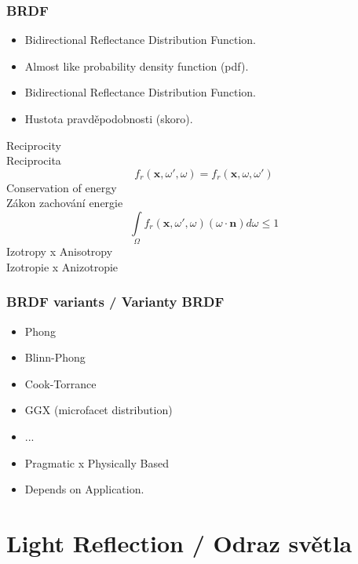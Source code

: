 \begin{frame}\frametitle{BRDF}
  \scriptsize
  \begin{itemize}
      \item Bidirectional Reflectance Distribution Function.
      \item Almost like probability density function (pdf).
  \end{itemize}
  \begin{itemize}
      \item Bidirectional Reflectance Distribution Function.
      \item Hustota pravděpodobnosti (skoro).
  \end{itemize}
  \pause\vfill
  Reciprocity\\
  Reciprocita
  \begin{equation*}
      f_r(\mathbf x, \omega', \omega) = f_r(\mathbf x, \omega, \omega')
  \end{equation*}
  Conservation of energy\\
  Zákon zachování energie
  \begin{equation*}
      \int\limits_\Omega f_r(\mathbf x, \omega', \omega) (\omega \cdot \mathbf n) d\omega \le 1
  \end{equation*}
  Izotropy x Anisotropy\\
  Izotropie x Anizotropie
\end{frame}

\begin{frame}\frametitle{BRDF variants / Varianty BRDF}
  \begin{itemize}
    \item Phong
    \item Blinn-Phong
    \item Cook-Torrance
    \item GGX (microfacet distribution)
    \item ...
  \end{itemize}
  \pause\vfill
  \begin{itemize}
    \item Pragmatic x Physically Based
    \item Depends on Application.
  \end{itemize}
\end{frame}

\section{Light Reflection / Odraz světla}


